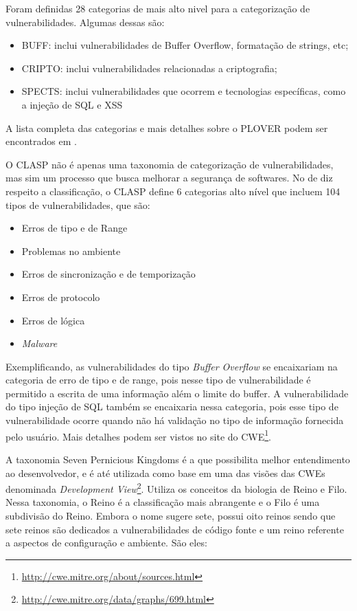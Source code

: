 %

Foram definidas 28 categorias de mais alto nivel para a categorização de vulnerabilidades. Algumas dessas são:

\begin{itemize}
\item BUFF: inclui vulnerabilidades de Buffer Overflow, formatação de strings, etc;
\item CRIPTO: inclui vulnerabilidades relacionadas a criptografia;
\item SPECTS: inclui vulnerabilidades que ocorrem e tecnologias específicas, como a injeção de SQL e XSS
\end{itemize}

A lista completa das categorias e mais detalhes sobre o PLOVER podem ser encontrados em \cite{christey2006}.

%

O CLASP não é apenas uma taxonomia de categorização de vulnerabilidades, mas sim um processo que busca melhorar a segurança de softwares. No de diz respeito a classificação, o CLASP define 6 categorias alto nível que incluem 104 tipos de vulnerabilidades, que são:

\begin{itemize}
\item Erros de tipo e de Range
\item Problemas no ambiente 
\item Erros de sincronização e de temporização
\item Erros de protocolo
\item Erros de lógica
\item \emph{Malware}
\end{itemize}

%
Exemplificando, as vulnerabilidades do tipo \emph{Buffer Overflow} se encaixariam na categoria de erro de tipo e de range, pois nesse tipo de vulnerabilidade é permitido a escrita de uma informação além o limite do buffer. A vulnerabilidade do tipo  injeção de SQL também se encaixaria nessa categoria, pois esse tipo de vulnerabilidade ocorre quando não há validação no tipo de informação fornecida pelo usuário. Mais detalhes podem ser vistos no site do CWE\footnote{\url{http://cwe.mitre.org/about/sources.html}}.

%

A taxonomia Seven Pernicious Kingdoms é a que possibilita melhor entendimento ao desenvolvedor, e é até utilizada como base em uma das visões das CWEs denominada \emph{Development View}\footnote{\url{http://cwe.mitre.org/data/graphs/699.html}}. Utiliza os conceitos da biologia de Reino e Filo. Nessa taxonomia, o Reino é a classificação mais abrangente e o Filo é uma subdivisão do Reino. Embora o nome sugere sete, possui oito reinos sendo que sete reinos são dedicados a vulnerabilidades de código fonte e um reino referente a aspectos de configuração e ambiente. São eles:

